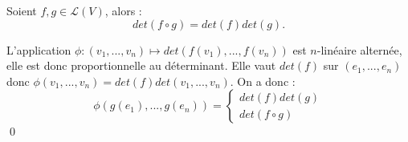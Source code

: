 \begin{prop}
Soient $f,g\in\mathcal L(V)$, alors :
\[det(f \circ g ) = det(f)det(g).\] 
\end{prop}

\begin{dem}
L'application $\phi : (v_1,...,v_n) \mapsto det(f(v_1),...,f(v_n))$ est $n$-linéaire alternée, elle est donc proportionnelle au déterminant. Elle vaut $det(f)$ sur $(e_1,...,e_n)$ donc $\phi(v_1,...,v_n) = det(f) det(v_1,...,v_n)$. On a donc :
\[\phi(g(e_1),...,g(e_n)) = \left\{\begin{array}{l}det(f)det(g) \\ det(f\circ g) \end{array}\right.\]
\qed 
\end{dem}



